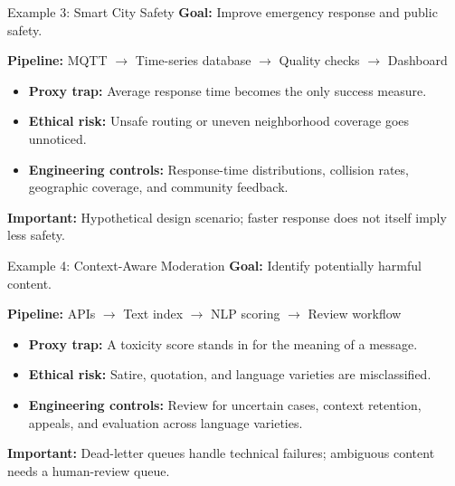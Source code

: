 \documentclass[aspectratio=43,10pt]{beamer}
\begin{document}
\begin{frame}{Example 3: Smart City Safety}
\textbf{Goal:} Improve emergency response and public safety.

\medskip
\textbf{Pipeline:} MQTT $\rightarrow$ Time-series database
$\rightarrow$ Quality checks $\rightarrow$ Dashboard

\medskip
\begin{itemize}
  \item \textbf{Proxy trap:} Average response time becomes
        the only success measure.
  \item \textbf{Ethical risk:} Unsafe routing or uneven
        neighborhood coverage goes unnoticed.
  \item \textbf{Engineering controls:} Response-time
        distributions, collision rates, geographic
        coverage, and community feedback.
\end{itemize}

\medskip
\textbf{Important:} Hypothetical design scenario;
faster response does not itself imply less safety.
\end{frame}

\begin{frame}{Example 4: Context-Aware Moderation}
\textbf{Goal:} Identify potentially harmful content.

\medskip
\textbf{Pipeline:} APIs $\rightarrow$ Text index
$\rightarrow$ NLP scoring $\rightarrow$ Review workflow

\medskip
\begin{itemize}
  \item \textbf{Proxy trap:} A toxicity score stands in
        for the meaning of a message.
  \item \textbf{Ethical risk:} Satire, quotation, and
        language varieties are misclassified.
  \item \textbf{Engineering controls:} Review for uncertain
        cases, context retention, appeals, and
        evaluation across language varieties.
\end{itemize}

\medskip
\textbf{Important:} Dead-letter queues handle technical
failures; ambiguous content needs a human-review queue.
\end{frame}
\end{document}
